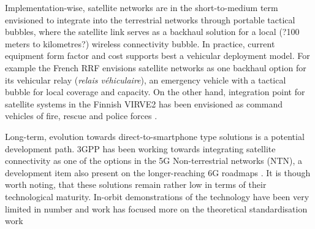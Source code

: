 \documentclass[english, 12pt, a4paper, elec, utf8, a-1b, online]{aaltothesis}
\begin{document}
Implementation-wise, satellite networks are in the short-to-medium term envisioned to integrate into the terrestrial networks through portable tactical bubbles, where the satellite link serves as a backhaul solution for a local (?100 meters to kilometres?) wireless connectivity bubble. In practice, current equipment form factor and cost supports best a vehicular deployment model. For example the French RRF envisions satellite networks as one backhaul option for its vehicular relay (\textit{relais véhiculaire}), an emergency vehicle with a tactical bubble for local coverage and capacity. On the other hand, integration point for satellite systems in the Finnish VIRVE2 has been envisioned as command vehicles of fire, rescue and police forces \cite{saynevirta2021satellite,dominguez2021resilience,kokkoniemitarkkanen2024missioncritical}. %

Long-term, evolution towards direct-to-smartphone type solutions is a potential development path. 3GPP has been working towards integrating satellite connectivity as one of the options in the 5G Non-terrestrial networks (NTN), a development item also present on the longer-reaching 6G roadmaps \cite{6G_ROADMAP, 3GPP_NTN_PAPERS}. It is though worth noting, that these solutions remain rather low in terms of their technological maturity. In-orbit demonstrations of the technology have been very limited in number and work has focused more on the theoretical standardisation work %
\end{document}
